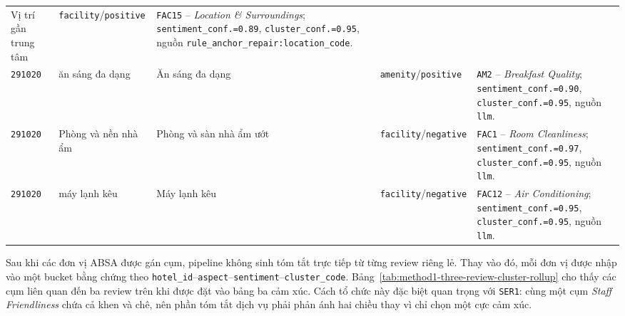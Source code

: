 \begin{table}[tbp]
\begin{tabularx}{\textwidth}{L{0.10\textwidth} L{0.22\textwidth} L{0.19\textwidth} L{0.16\textwidth} Y}
Vị trí gần trung tâm &
\texttt{facility}/\texttt{positive} &
\texttt{FAC15} -- \textit{Location \& Surroundings}; \texttt{sentiment\_conf.=0.89}, \texttt{cluster\_conf.=0.95}, nguồn \texttt{rule\_anchor\_repair:location\_code}. \\
\texttt{291020} & ăn sáng đa dạng &
Ăn sáng đa dạng &
\texttt{amenity}/\texttt{positive} &
\texttt{AM2} -- \textit{Breakfast Quality}; \texttt{sentiment\_conf.=0.90}, \texttt{cluster\_conf.=0.95}, nguồn \texttt{llm}. \\
\texttt{291020} & Phòng và nền nhà ẩm &
Phòng và sàn nhà ẩm ướt &
\texttt{facility}/\texttt{negative} &
\texttt{FAC1} -- \textit{Room Cleanliness}; \texttt{sentiment\_conf.=0.97}, \texttt{cluster\_conf.=0.95}, nguồn \texttt{llm}. \\
\texttt{291020} & máy lạnh kêu &
Máy lạnh kêu &
\texttt{facility}/\texttt{negative} &
\texttt{FAC12} -- \textit{Air Conditioning}; \texttt{sentiment\_conf.=0.95}, \texttt{cluster\_conf.=0.95}, nguồn \texttt{llm}. \\
\bottomrule
\end{tabularx}
\end{table}

Sau khi các đơn vị ABSA được gán cụm, pipeline không sinh tóm tắt trực tiếp từ
từng review riêng lẻ. Thay vào đó, mỗi đơn vị được nhập vào một bucket bằng
chứng theo \texttt{hotel\_id}--\texttt{aspect}--\texttt{sentiment}--\texttt{cluster\_code}.
Bảng~\ref{tab:method1-three-review-cluster-rollup} cho thấy các cụm liên quan
đến ba review trên khi được đặt vào bảng ba cảm xúc. Cách tổ chức này đặc biệt
quan trọng với \texttt{SER1}: cùng một cụm \textit{Staff Friendliness} chứa cả
khen và chê, nên phần tóm tắt dịch vụ phải phản ánh hai chiều thay vì chỉ chọn
một cực cảm xúc.

